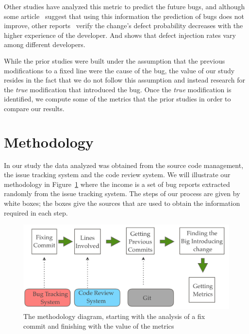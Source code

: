 \documentclass[10pt, conference]{IEEEtran}
\begin{document}
Other studies have analyzed this metric to predict the future bugs, and although some article~\cite{weyuker2010programmer} suggest that using this information the prediction of bugs does not improve, other reports~\cite{mockus2000predicting} verify the change's defect probability decreases with the higher experience of the developer. And \cite{matsumoto2010analysis} shows that defect injection rates vary among different developers.


While the prior studies were built under the assumption that the previous modifications to a fixed line were the cause of the bug, the value of our study resides in the fact that we do not follow this assumption and instead research for the \emph{true} modification that introduced the bug. Once the \emph{true} modification is identified, we compute some of the metrics that the prior studies in order to compare our results. 

\section{Methodology}
\label{sec:methodology}

In our study the data analyzed was obtained from the source code management, the issue tracking system and the code review system. We will illustrate our methodology in Figure~\ref{fig:methodology} where the income is a set of bug reports extracted randomly from the issue tracking system. The steps of our process are given by white boxes; the  boxes give the sources that are used to obtain the information required in each step.

\begin{figure}[ht]
\centering
\includegraphics[width=\columnwidth]{methodology.png}
\caption{The methodology diagram, starting with the analysis of a fix commit and finishing with the value of the metrics}
\label{fig:methodology}       %
\end{figure}
\end{document}
